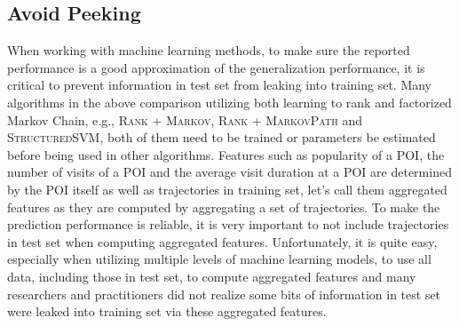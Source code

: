 \subsection{Avoid Peeking}
When working with machine learning methods, to make sure the reported performance is a good approximation
of the generalization performance, it is critical to prevent information in test set from leaking into
training set.
Many algorithms in the above comparison utilizing both learning to rank and factorized Markov Chain, 
e.g., \textsc{Rank} + \textsc{Markov}, \textsc{Rank} + \textsc{MarkovPath} and \textsc{StructuredSVM},
both of them need to be trained or parameters be estimated before being used in other algorithms.
Features such as popularity of a POI, the number of visits of a POI and the average visit duration at a POI are
determined by the POI itself as well as trajectories in training set, let's call them aggregated features as they are 
computed by aggregating a set of trajectories.
To make the prediction performance is reliable, it is very important to not include trajectories in test set 
when computing aggregated features.
Unfortunately, it is quite easy, especially when utilizing multiple levels of machine learning models,
to use all data, including those in test set, to compute aggregated features and many researchers and 
practitioners did not realize some bits of information in test set were leaked into training set via these aggregated features.



